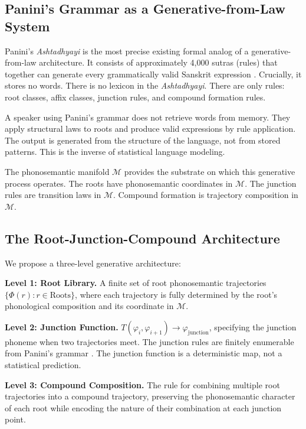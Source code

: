 \documentclass[12pt]{article}
\begin{document}
\subsection{Panini's Grammar as a Generative-from-Law System}

Panini's \textit{Ashtadhyayi} is the most precise existing formal analog of a generative-from-law architecture. It consists of approximately 4,000 sutras (rules) that together can generate every grammatically valid Sanskrit expression \cite{kiparsky1982}. Crucially, it stores no words. There is no lexicon in the \textit{Ashtadhyayi}. There are only rules: root classes, affix classes, junction rules, and compound formation rules.

A speaker using Panini's grammar does not retrieve words from memory. They apply structural laws to roots and produce valid expressions by rule application. The output is generated from the structure of the language, not from stored patterns. This is the inverse of statistical language modeling.

The phonosemantic manifold $\mathcal{M}$ provides the substrate on which this generative process operates. The roots have phonosemantic coordinates in $\mathcal{M}$. The junction rules are transition laws in $\mathcal{M}$. Compound formation is trajectory composition in $\mathcal{M}$.

\subsection{The Root-Junction-Compound Architecture}

We propose a three-level generative architecture:

\textbf{Level 1: Root Library.} A finite set of root phonosemantic trajectories $\{\Phi(r) : r \in \text{Roots}\}$, where each trajectory is fully determined by the root's phonological composition and its coordinate in $\mathcal{M}$.

\textbf{Level 2: Junction Function.} $T(\varphi_i, \varphi_{i+1}) \to \varphi_\text{junction}$, specifying the junction phoneme when two trajectories meet. The junction rules are finitely enumerable from Panini's grammar \cite{kiparsky1982}. The junction function is a deterministic map, not a statistical prediction.

\textbf{Level 3: Compound Composition.} The rule for combining multiple root trajectories into a compound trajectory, preserving the phonosemantic character of each root while encoding the nature of their combination at each junction point.
\end{document}
